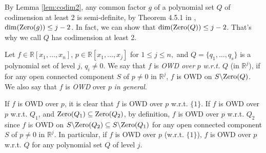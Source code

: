 \documentclass[amsthm]{elsart}
\def  \zero {{\rm Zero}}
\def \RR {{\mathbb R}}
\begin{document}
By Lemma \ref{lem:codim2}, any common factor $g$ of a polynomial set $Q$ of codimension at least 2 is semi-definite, by Theorem 4.5.1 in \citep{bochnak2013real}, $\dim(\zero(g))\le j-2$. In fact, we can show that $\dim(\zero(Q))\le j-2$. That's why we call $Q$ has codimension at least 2.

\begin{defn}\label{def:generalweakopendeli}
Let $f\in\RR[x_1,\ldots,x_n]$, $p\in \RR[x_1,\ldots,x_j]$ for $1\le j\le n,$ and $Q=\{q_1,\ldots,q_s\}$ is a polynomial set of level $j$, $q_i\neq0$. We say that $f$ is \emph{OWD over} $p$ \emph{w.r.t.} $Q$ (in $\RR^j$), if for any open connected component $S$ of $p\neq0$ in $\RR^j$, $f$ is OWD on $S\backslash\zero(Q)$. We also say that $f$ is \emph{OWD} over $p$ \emph{in general}.
\end{defn}\begin{rem}
If $f$ is OWD over $p$, it is clear that $f$ is OWD over $p$ w.r.t. $\{1\}$. If $f$ is OWD over $p$ w.r.t. $Q_1$, and $\zero(Q_1)\subseteq\zero(Q_2)$, by definition, $f$ is OWD over $p$ w.r.t. $Q_2$ since $f$ is OWD on $S\backslash \zero(Q_2)\subseteq S\backslash \zero(Q_1)$ for any open connected component $S$ of $p\neq0$ in $\RR^j$. In particular, if $f$ is OWD over $p$ (w.r.t. $\{1\}$), $f$ is OWD over $p$ w.r.t. $Q$ for any polynomial set $Q$ of level $j$.
\end{rem}
\end{document}
